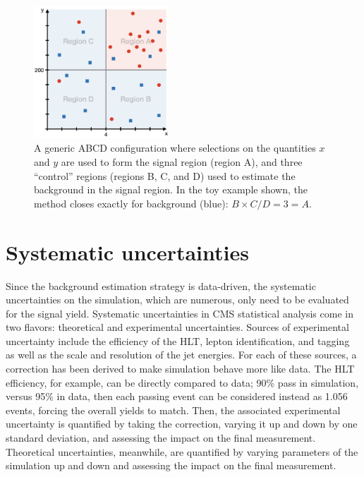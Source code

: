\begin{figure}[htb]
    \centering
    \includegraphics[width=0.45\textwidth]{fig/generic_abcd_cartoon.png}
    \caption[A generic ABCD configuration]{
        A generic ABCD configuration where selections on the quantities $x$ and $y$ are used to form the signal region (region A), and three ``control'' regions (regions B, C, and D) used to estimate the background in the signal region. 
        In the toy example shown, the method closes exactly for background (blue): $B\times C/D = 3 = A$. 
    }
    \label{fig:abcd}
\end{figure}

\section{Systematic uncertainties}
Since the background estimation strategy is data-driven, the systematic uncertainties on the simulation, which are numerous, only need to be evaluated for the signal yield. 
Systematic uncertainties in CMS statistical analysis come in two flavors: theoretical and experimental uncertainties. 
Sources of experimental uncertainty include the efficiency of the HLT, lepton identification, and \PQb tagging as well as the scale and resolution of the jet energies. 
For each of these sources, a correction has been derived to make simulation behave more like data. 
The HLT efficiency, for example, can be directly compared to data; 90\% pass in simulation, versus 95\% in data, then each passing event can be considered instead as 1.056 events, forcing the overall yields to match. 
Then, the associated experimental uncertainty is quantified by taking the correction, varying it up and down by one standard deviation\footnotemark{}, and assessing the impact on the final measurement. 
Theoretical uncertainties, meanwhile, are quantified by varying parameters of the simulation up and down and assessing the impact on the final measurement. 

